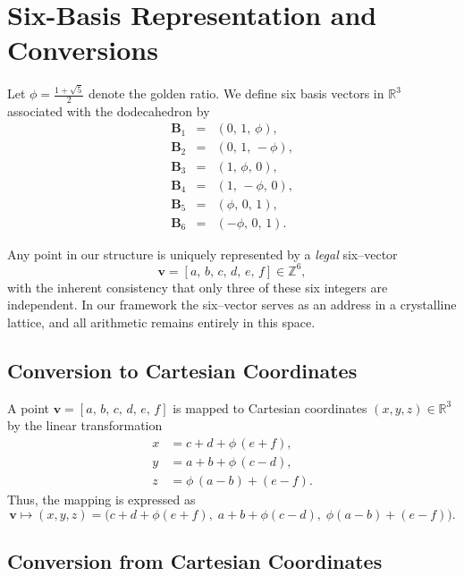\documentclass{article}
\begin{document}
\section*{Six-Basis Representation and Conversions}

Let \(\phi = \frac{1+\sqrt{5}}{2}\) denote the golden ratio. We define six basis vectors in \(\mathbb{R}^3\) associated with the dodecahedron by
\[
\begin{array}{rcl}
\mathbf{B}_1 &=& (0,\, 1,\, \phi),\\[1mm]
\mathbf{B}_2 &=& (0,\, 1,\,-\phi),\\[1mm]
\mathbf{B}_3 &=& (1,\, \phi,\, 0),\\[1mm]
\mathbf{B}_4 &=& (1,\,-\phi,\, 0),\\[1mm]
\mathbf{B}_5 &=& (\phi,\, 0,\, 1),\\[1mm]
\mathbf{B}_6 &=& (-\phi,\, 0,\, 1).
\end{array}
\]

Any point in our structure is uniquely represented by a \emph{legal} six–vector 
\[
\mathbf{v} = [a,\, b,\, c,\, d,\, e,\, f] \in \mathbb{Z}^6,
\]
with the inherent consistency that only three of these six integers are independent. In our framework the six–vector serves as an address in a crystalline lattice, and all arithmetic remains entirely in this space.

\subsection*{Conversion to Cartesian Coordinates}

A point \(\mathbf{v} = [a,\, b,\, c,\, d,\, e,\, f]\) is mapped to Cartesian coordinates \((x,y,z) \in \mathbb{R}^3\) by the linear transformation
\[
\begin{aligned}
x &= c + d + \phi\,(e + f),\\[1mm]
y &= a + b + \phi\,(c - d),\\[1mm]
z &= \phi\,(a - b) + (e - f).
\end{aligned}
\]
Thus, the mapping is expressed as
\[
\mathbf{v} \mapsto (x,y,z) = \bigl( c+d+\phi(e+f),\; a+b+\phi(c-d),\; \phi(a-b)+(e-f) \bigr).
\]

\subsection*{Conversion from Cartesian Coordinates}
\end{document}
